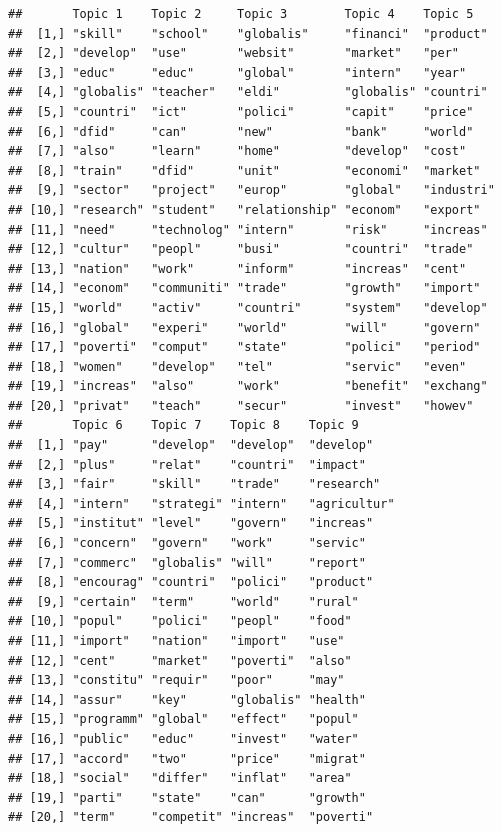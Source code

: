 \documentclass[11pt,article,oneside]{memoir}
\begin{document}
\begin{verbatim}
##       Topic 1    Topic 2     Topic 3        Topic 4    Topic 5   
##  [1,] "skill"    "school"    "globalis"     "financi"  "product" 
##  [2,] "develop"  "use"       "websit"       "market"   "per"     
##  [3,] "educ"     "educ"      "global"       "intern"   "year"    
##  [4,] "globalis" "teacher"   "eldi"         "globalis" "countri" 
##  [5,] "countri"  "ict"       "polici"       "capit"    "price"   
##  [6,] "dfid"     "can"       "new"          "bank"     "world"   
##  [7,] "also"     "learn"     "home"         "develop"  "cost"    
##  [8,] "train"    "dfid"      "unit"         "economi"  "market"  
##  [9,] "sector"   "project"   "europ"        "global"   "industri"
## [10,] "research" "student"   "relationship" "econom"   "export"  
## [11,] "need"     "technolog" "intern"       "risk"     "increas" 
## [12,] "cultur"   "peopl"     "busi"         "countri"  "trade"   
## [13,] "nation"   "work"      "inform"       "increas"  "cent"    
## [14,] "econom"   "communiti" "trade"        "growth"   "import"  
## [15,] "world"    "activ"     "countri"      "system"   "develop" 
## [16,] "global"   "experi"    "world"        "will"     "govern"  
## [17,] "poverti"  "comput"    "state"        "polici"   "period"  
## [18,] "women"    "develop"   "tel"          "servic"   "even"    
## [19,] "increas"  "also"      "work"         "benefit"  "exchang" 
## [20,] "privat"   "teach"     "secur"        "invest"   "howev"   
##       Topic 6    Topic 7    Topic 8    Topic 9     
##  [1,] "pay"      "develop"  "develop"  "develop"   
##  [2,] "plus"     "relat"    "countri"  "impact"    
##  [3,] "fair"     "skill"    "trade"    "research"  
##  [4,] "intern"   "strategi" "intern"   "agricultur"
##  [5,] "institut" "level"    "govern"   "increas"   
##  [6,] "concern"  "govern"   "work"     "servic"    
##  [7,] "commerc"  "globalis" "will"     "report"    
##  [8,] "encourag" "countri"  "polici"   "product"   
##  [9,] "certain"  "term"     "world"    "rural"     
## [10,] "popul"    "polici"   "peopl"    "food"      
## [11,] "import"   "nation"   "import"   "use"       
## [12,] "cent"     "market"   "poverti"  "also"      
## [13,] "constitu" "requir"   "poor"     "may"       
## [14,] "assur"    "key"      "globalis" "health"    
## [15,] "programm" "global"   "effect"   "popul"     
## [16,] "public"   "educ"     "invest"   "water"     
## [17,] "accord"   "two"      "price"    "migrat"    
## [18,] "social"   "differ"   "inflat"   "area"      
## [19,] "parti"    "state"    "can"      "growth"    
## [20,] "term"     "competit" "increas"  "poverti"
\end{verbatim}
\end{document}
